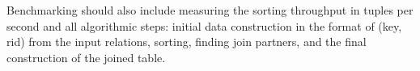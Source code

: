 
Benchmarking should also include measuring the sorting throughput in tuples per second and all 
algorithmic steps: initial data construction in the format of (key, rid) from the input relations,
sorting, finding join partners, and the final construction of the joined table. 


